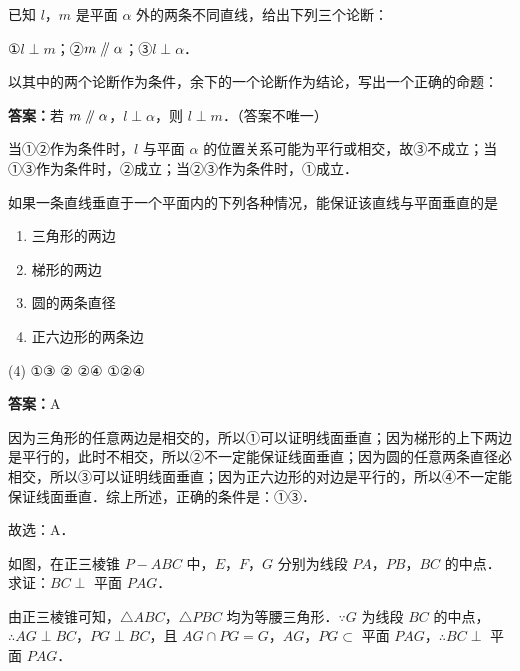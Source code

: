 \vspace{2em}

\begin{example}[\bkstar{2}{5}]
已知 $l$，$m$ 是平面 $\alpha$ 外的两条不同直线，给出下列三个论断：

①$l\perp m$；②$m\mathrel{/\mkern-5mu/}\alpha$；③$l\perp\alpha$．

以其中的两个论断作为条件，余下的一个论断作为结论，写出一个正确的命题：
\end{example}
\begin{solution}
\textbf{答案：}若 $m\mathrel{/\mkern-5mu/}\alpha$，$l\perp\alpha$，则 $l\perp m$．（答案不唯一）

当①②作为条件时，$l$ 与平面 $\alpha$ 的位置关系可能为平行或相交，故③不成立；当①③作为条件时，②成立；当②③作为条件时，①成立．
\end{solution}

\vspace{2em}


\begin{example}[\bkstar{2}{5}]
如果一条直线垂直于一个平面内的下列各种情况，能保证该直线与平面垂直的是
\begin{enumerate}
    \item[①] 三角形的两边
    \item[②] 梯形的两边
    \item[③] 圆的两条直径
    \item[④] 正六边形的两条边
\end{enumerate}
\begin{tasks}(4)
    \task ①③
    \task ②
    \task ②④
    \task ①②④
\end{tasks}
\end{example}
\begin{solution}
\textbf{答案：}A

因为三角形的任意两边是相交的，所以①可以证明线面垂直；因为梯形的上下两边是平行的，此时不相交，所以②不一定能保证线面垂直；因为圆的任意两条直径必相交，所以③可以证明线面垂直；因为正六边形的对边是平行的，所以④不一定能保证线面垂直．综上所述，正确的条件是：①③．

故选：A．
\end{solution}

\vspace{2em}

\begin{example}[\bkstar{3}{5}]
如图，在正三棱锥 $P-ABC$ 中，$E$，$F$，$G$ 分别为线段 $PA$，$PB$，$BC$ 的中点．求证：$BC\perp$ 平面 $PAG$．
\end{example}
\begin{solution}
由正三棱锥可知，$\triangle ABC$，$\triangle PBC$ 均为等腰三角形．$\because G$ 为线段 $BC$ 的中点，$\therefore AG\perp BC$，$PG\perp BC$，且 $AG\cap PG=G$，$AG$，$PG\subset$ 平面 $PAG$，$\therefore BC\perp$ 平面 $PAG$．
\end{solution}

